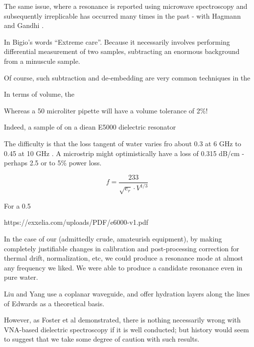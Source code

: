 \documentclass[paper.tex]{subfiles}
\begin{document}
\begin{multicols}{1}
The same issue, where a resonance is reported using microwave spectroscopy and subsequently irreplicable has occurred many times in the past - with Hagmann and Gandhi \cite{Substitution1982}. 

In Bigio’s words “Extreme care”. Because it necessarily involves performing differential measurement of two samples, subtracting an enormous background from a minuscule sample.

Of course, such subtraction and de-embedding are very common techniques in the 

In terms of volume, the 


Whereas a 50 microliter pipette will have a volume tolerance of 2\%! 




Indeed, a sample of on a diean E5000 dielectric resonator 

The difficulty is that the loss tangent of water varies fro about 0.3 at 6 GHz to 0.45 at 10 GHz \cite{Metamaterial2015}. A microstrip might optimistically have a loss of 0.315 dB/cm - perhaps 2.5 or to 5\% power loss. 

$$f = \frac{233}{\sqrt{e_r}\cdot{V^{1/3}}}$$






For a 0.5%

https://exxelia.com/uploads/PDF/e6000-v1.pdf


In the case of our (admittedly crude, amateurish equipment), by making completely justifiable changes in calibration and post-processing correction for thermal drift, normalization, etc, we could produce a resonance mode at almost any frequency we liked. We were able to produce a candidate resonance even in pure water.


Liu and Yang use a coplanar waveguide, and offer hydration layers along the lines of Edwards as a theoretical basis.




However, as Foster et al demonstrated, there is nothing necessarily wrong with VNA-based dielectric spectroscopy if it is well conducted; but history would seem to suggest that we take some degree of caution with such results.



\end{multicols}
\end{document}
